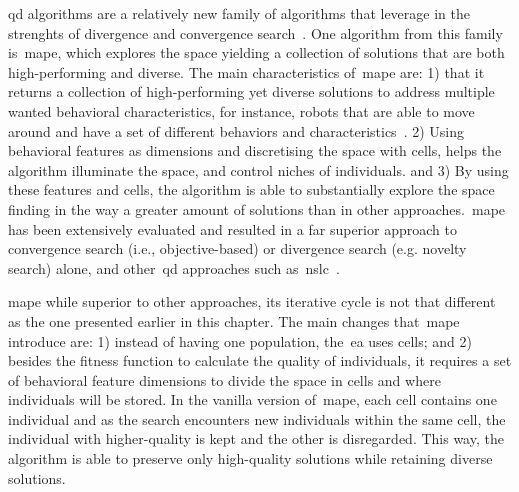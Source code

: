 
\acrlong{qd} algorithms are a relatively new family of algorithms that leverage in the strenghts of divergence and convergence search~\cite{Pugh2016}. One algorithm from this family is~\acrshort{mape}, which explores the space yielding a collection of solutions that are both high-performing and diverse. The main characteristics of~\acrshort{mape} are: 1) that it returns a collection of high-performing yet diverse solutions to address multiple wanted behavioral characteristics, for instance, robots that are able to move around and have a set of different behaviors and characteristics~\cite{Cully2015-qdRobotsAnimals}. 2) Using behavioral features as dimensions and discretising the space with cells, helps the algorithm illuminate the space, and control niches of individuals. and 3) By using these features and cells, the algorithm is able to substantially explore the space finding in the way a greater amount of solutions than in other approaches.~\acrshort{mape} has been extensively evaluated and resulted in a far superior approach to convergence search (i.e., objective-based) or divergence search (e.g. novelty search) alone, and other~\acrshort{qd} approaches such as~\acrshort{nslc}~\cite{Mouret2015}. 

\acrshort{mape} while superior to other approaches, its iterative cycle is not that different as the one presented earlier in this chapter. The main changes that~\acrshort{mape} introduce are: 1) instead of having one population, the~\acrshort{ea} uses cells; and 2) besides the fitness function to calculate the quality of individuals, it requires a set of behavioral feature dimensions to divide the space in cells and where individuals will be stored. In the vanilla version of~\acrshort{mape}, each cell contains one individual and as the search encounters new individuals within the same cell, the individual with higher-quality is kept and the other is disregarded. This way, the algorithm is able to preserve only high-quality solutions while retaining diverse solutions. 

